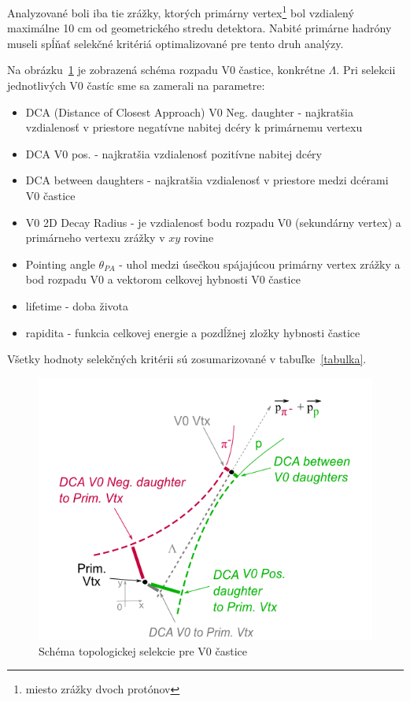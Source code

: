 \documentclass[thesismargins, thesislinespacing]{rnthesis}
\begin{document}
Analyzované boli iba tie zrážky, ktorých primárny vertex\footnote{miesto zrážky dvoch protónov} bol vzdialený maximálne 10 cm od geometrického stredu detektora. Nabité primárne hadróny museli spĺňať selekčné kritériá optimalizované pre tento druh analýzy.

Na obrázku~\ref{schema} je zobrazená schéma rozpadu V0 častice, konkrétne $\Lambda$. Pri selekcii jednotlivých V0 častíc sme sa zamerali na parametre:
\begin{itemize}
	\item DCA (Distance of Closest Approach) V0 Neg. daughter - najkratšia vzdialenosť v priestore negatívne nabitej dcéry k primárnemu vertexu
	\item DCA V0 pos. - najkratšia vzdialenosť pozitívne nabitej dcéry
	\item DCA between daughters - najkratšia vzdialenosť v priestore medzi dcérami V0 častice
	\item V0 2D Decay Radius  - je vzdialenosť bodu rozpadu V0 (sekundárny vertex) a primárneho vertexu zrážky v $xy$ rovine
	\item Pointing angle $\theta_{PA}$ - uhol medzi úsečkou spájajúcou primárny vertex zrážky a bod rozpadu V0 a vektorom celkovej hybnosti V0 častice
	\item lifetime - doba života
	\item rapidita - funkcia celkovej energie a pozdĺžnej zložky hybnosti častice
\end{itemize} 
Všetky hodnoty selekčných kritérii sú zosumarizované v tabuľke~\ref{tabulka}.

\begin{figure}[hbtp!]
	\centering
	\includegraphics[scale=0.9]{./Obrazky_praca/SchemaV0.png}
	\caption{Schéma topologickej selekcie pre V0 častice~\cite{schema}}
	\label{schema} 
\end{figure}
\end{document}
